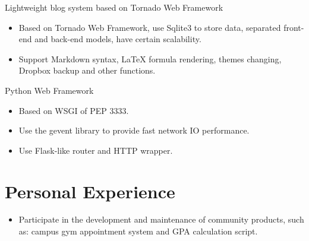 \documentclass{resume}
\newcommand{\en}[1]{#1}
\newcommand{\zh}[1]{}
\begin{document}
\en{Lightweight blog system based on Tornado Web Framework}
\zh{基于 Tornado Web Framework 的轻量级博客系统}
\begin{itemize}
      \item \en{Based on Tornado Web Framework, use Sqlite3 to store data, separated front-end and back-end models, have certain scalability.}
            \zh{基于 Tornado Web Framework 开发，使用 Sqlite3 存储数据，前后端分离，有一定扩展性}
      \item \en{Support Markdown syntax, LaTeX formula rendering, themes changing, Dropbox backup and other functions.}
            \zh{支持Markdown语法，LaTeX公式渲染，主题更换以及Dropbox备份等功能}
\end{itemize}

\en{Python Web Framework}
\zh{Python Web 框架}
\begin{itemize}
      \item \en{Based on WSGI of PEP 3333.}
            \zh{基于 PEP 3333 的 WSGI 实现}
      \item \en{Use the gevent library to provide fast network IO performance.}
            \zh{使用 gevent 库提供快速的网络 IO 表现}
      \item \en{Use Flask-like router and HTTP wrapper.}
            \zh{使用了类 Flask 的路由功能和 HTTP 封装}
\end{itemize}

\section{\en{Personal Experience}\zh{个人经历}}
\en{}
\zh{\datedsubsection{\textbf{北京邮电大学 BYRIO 开源社区}}{2018 -- 至今}}
\en{}
\zh{\role{开发者}{技术部}}
\begin{itemize}
      \item \en{Participate in the development and maintenance of community products, such as: campus gym appointment system and GPA calculation script.}
            \zh{参加北邮校园相关产品的开发与维护，如：校园健身房预约系统，北邮教务绩点查询计算脚本}
\end{itemize}
\end{document}

